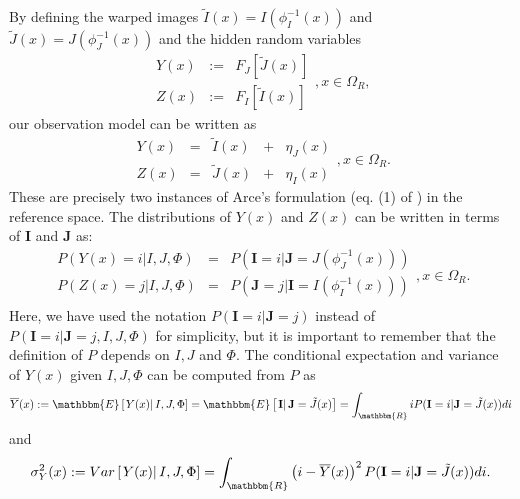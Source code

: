 By defining the warped images \hbox{$\tilde{I}(x) = I(\phi_{I}^{-1}(x))$} and \hbox{$\tilde{J}(x) = J(\phi_{J}^{-1}(x))$} and the hidden random variables \cite{Arce-santana2014} \cite{Dempster1977} \cite{Li2001}
\begin{equation}\label{eq:hidden_fields}
    \begin{array}{ccc}
        Y(x) &:=& F_{J}\left[\tilde{J}(x)\right]\\[+2mm]
        Z(x) &:=& F_{I}\left[\tilde{I}(x)\right]
    \end{array},x\in\Omega_{R},
\end{equation}
our observation model can be written as
\begin{equation}\label{eq:SyNEM_gom_update}
    \begin{array}{ccccc}
    	Y(x) &=& \tilde{I}(x) &+& \eta_{J}(x)\\
        Z(x) &=& \tilde{J}(x) &+& \eta_{I}(x)
    \end{array}, x\in\Omega_{R}.
\end{equation}
These are precisely two instances of Arce's formulation (eq. (1) of \cite{Arce-santana2014}) in the reference space. The distributions of $Y(x)$ and $Z(x)$ can be written in terms of $\mathbf{I}$ and $\mathbf{J}$ as:
\begin{equation}\label{eq:y_z_i_j_relationship}
    \begin{array}{ccccc}
    	P(Y(x) = i | I, J, \Phi) &=& P(\mathbf{I}=i | \mathbf{J} = J(\phi_{J}^{-1}(x)))\\
        P(Z(x) = j | I, J, \Phi) &=& P(\mathbf{J}=j | \mathbf{I} = I(\phi_{I}^{-1}(x)))\\
    \end{array}, x\in\Omega_{R}.
\end{equation}
Here, we have used the notation $P(\mathbf{I}=i | \mathbf{J} = j)$ instead of \hbox{$P(\mathbf{I}=i | \mathbf{J} = j, I, J, \Phi)$} for simplicity, but it is important to remember that the definition of $P$ depends on $I, J$ and $\Phi$. The conditional expectation and variance of $Y(x)$ given $I, J, \Phi$ can be computed from $P$ as
\begin{equation}\label{eq:expectation_transfer}
    \overline{Y}(x) := \mathbbm{E}\left[\left.Y(x) \right| I, J, \Phi\right] = \mathbbm{E}\left[\left.\mathbf{I} \right| \mathbf{J} = \tilde{J}(x)\right] =
    \int_{\mathbbm{R}} i P(\mathbf{I}=i | \mathbf{J}=\tilde{J}(x)) di
\end{equation}
and
\begin{equation}\label{eq:expectation_variance}
    \sigma_{Y}^{2}(x) := Var\left[\left.Y(x) \right| I, J, \Phi\right] = \int_{\mathbbm{R}} \left(i - \overline{Y}(x)\right)^{2} P(\mathbf{I}=i | \mathbf{J}=\tilde{J}(x)) di.
\end{equation}
